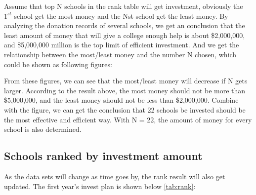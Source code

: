	Assume that top N schools in the rank table will get investment, obviously the $1^{st}$ school get the most money and the Nst school get the least money. By analyzing the donation records of several schools, we get an conclusion that the least amount of money that will give a college enough help is about \$2,000,000, and \$5,000,000 million is the top limit of efficient investment. And we get the relationship between the most/least money and the number N chosen, which could be shown as following figures:

\begin{figure}[h]
      \begin{floatrow}
      \end{floatrow}
    \end{figure}

From these figures, we can see that the most/least money will decrease if N gets larger. According to the result above, the most money should not be more than \$5,000,000, and the least money should not be less than \$2,000,000. Combine with the figure, we can get the conclusion that 22 schools be invested should be the most effective and efficient way. With N = 22, the amount of money for every school is also determined.

	\subsection{Schools ranked by investment amount}
As the data sets will change as time goes by, the rank result will also get updated. The first year's invest plan is shown below \autoref{tab:rank}:

